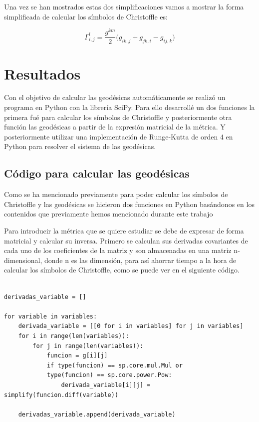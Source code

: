 \documentclass[pdftex,11pt,a4paper]{book}
\begin{document}
Una vez se han mostrados estas dos simplificaciones vamos a mostrar la forma simplificada de calcular los símbolos de Christoffle es: 

\begin{equation}\label{eq:simbolos}
    \Gamma^l_{i,j}= \frac{g^{km}}{2}\bigg(g_{ik,j} + g_{jk,i}-g_{ij,k} \bigg)
\end{equation}




\chapter{Resultados}

Con el objetivo de calcular las geodésicas automáticamente se realizó un programa en Python con la librería SciPy. Para ello desarrollé un dos funciones la primera fué  para calcular los símbolos de Christoffle y posteriormente otra función las geodésicas a partir de la expresión matricial de la métrica. Y posteriormente utilizar una implementación de Runge-Kutta de orden 4 en Python para resolver el sistema de las geodésicas.


\section{Código para calcular las geodésicas}

Como se ha mencionado previamente para poder calcular los símbolos de Christoffle y las geodésicas se hicieron dos funciones en Python basándonos en los contenidos que previamente hemos mencionado durante este trabajo 

Para introducir la métrica que se quiere estudiar se debe de expresar de forma matricial y calcular su inversa. Primero se calculan sus derivadas covariantes de cada uno de los coeficientes de la matriz y son almacenadas en una matriz n-dimensional, donde n es las dimensión, para así ahorrar tiempo a la hora de calcular los símbolos de Christoffle, como se puede ver en el siguiente código. 
\begin{verbatim}

derivadas_variable = []

for variable in variables: 
    derivada_variable = [[0 for i in variables] for j in variables]
    for i in range(len(variables)):
        for j in range(len(variables)): 
            funcion = g[i][j]
            if type(funcion) == sp.core.mul.Mul or
            type(funcion) == sp.core.power.Pow: 
                derivada_variable[i][j] = simplify(funcion.diff(variable))
                
    derivadas_variable.append(derivada_variable)
\end{verbatim}
\end{document}
